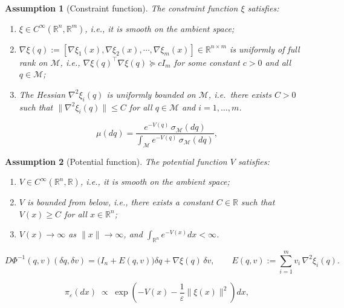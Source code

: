 \documentclass[10pt,a4paper]{amsart}
\newtheorem{assumption}{Assumption}
\begin{document}
\begin{assumption}[Constraint function]\label{ass:xi}
The constraint function $\xi$ satisfies:
\begin{enumerate}
    \item[(i)] $\xi \in C^\infty(\mathbb{R}^n, \mathbb R^m)$, i.e., it is smooth on the ambient space;
    \item[(ii)] $\nabla \xi(q):=[\nabla\xi_1(x),\nabla\xi_2(x),\cdots,\nabla\xi_m(x)]\in\mathbb R^{n\times m}$ is uniformly of full rank on $\mathcal{M}$, i.e., $\nabla \xi(q)^\top \nabla \xi(q) \succeq c I_m$ for some constant $c > 0$ and all $q \in \mathcal{M}$;
    \item[(iii)] The Hessian $\nabla^2 \xi_i(q)$ is uniformly bounded on 
    $\mathcal{M}$, i.e.\ there exists $C > 0$ such that 
    $\|\nabla^2 \xi_i(q)\| \le C$ for all $q \in \mathcal{M}$ and 
    $i = 1,\ldots,m$.
\end{enumerate}
\end{assumption}

\begin{equation}\label{eq:target_measure}
\mu(dq) 
= \frac{e^{-V(q)} \, \sigma_{\mathcal{M}}(dq)}{\int_{\mathcal{M}} e^{-V(q)} \, \sigma_{\mathcal{M}}(dq)},
\end{equation}

\begin{assumption}[Potential function]\label{ass:potential}
The potential function $V$ satisfies:
\begin{enumerate}
    \item[(i)] $V \in C^\infty(\mathbb{R}^n,\mathbb R)$, i.e., it is smooth on the ambient space;
    \item[(ii)] $V$ is bounded from below, i.e., there exists a constant $C \in \mathbb{R}$ such that $V(x) \ge C$ for all $x \in \mathbb{R}^n$;
    \item[(iii)] $V(x) \to \infty$ as $\|x\| \to \infty$, and $\int_{\mathbb{R}^n} e^{-V(x)} dx < \infty$.
\end{enumerate}
\end{assumption}

\begin{equation}\label{eq:dphi-1}
    D\Phi^{-1}(q,v)(\delta q, \delta v)
    = \bigl(I_n + E(q,v)\bigr)\delta q + \nabla\xi(q)\,\delta v,
    \qquad
    E(q,v) := \sum_{i=1}^m v_i\,\nabla^2\xi_i(q).
\end{equation}

\begin{equation}
\label{eq:tubular_relaxation}
\pi_\varepsilon(dx)
\;\propto\;
\exp\!\left(
- V(x)
- \frac{1}{\varepsilon}\|\xi(x)\|^2
\right) dx,
\end{equation}
\end{document}
